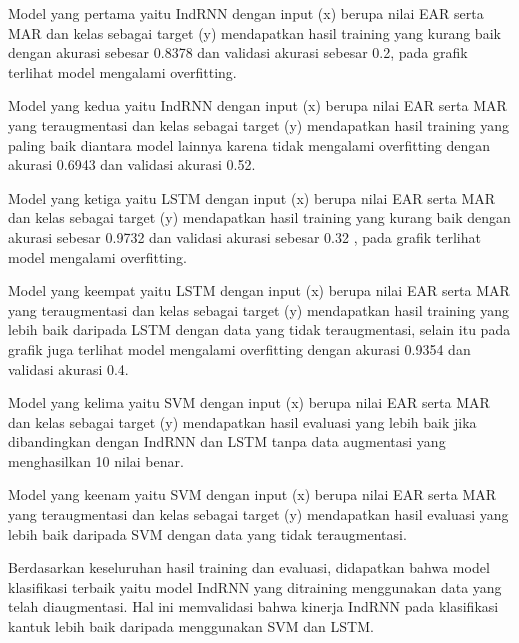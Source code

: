 Model yang pertama yaitu IndRNN dengan input (x) berupa nilai EAR serta MAR dan kelas
sebagai target (y) mendapatkan hasil training yang kurang baik dengan akurasi sebesar 0.8378 dan validasi akurasi sebesar 0.2,
pada grafik terlihat model mengalami overfitting.

Model yang kedua yaitu IndRNN dengan input (x) berupa nilai EAR serta MAR yang teraugmentasi dan kelas
sebagai target (y) mendapatkan hasil training yang paling baik diantara model lainnya karena tidak mengalami
overfitting dengan akurasi 0.6943 dan validasi akurasi 0.52.

Model yang ketiga yaitu LSTM dengan input (x) berupa nilai EAR serta MAR dan kelas
sebagai target (y) mendapatkan hasil training yang kurang baik dengan akurasi sebesar 0.9732 dan validasi akurasi sebesar 0.32
, pada grafik terlihat model mengalami overfitting.

Model yang keempat yaitu LSTM dengan input (x) berupa nilai EAR serta MAR yang teraugmentasi dan kelas
sebagai target (y) mendapatkan hasil training yang lebih baik daripada LSTM dengan data yang tidak teraugmentasi,
selain itu pada grafik juga terlihat model mengalami overfitting dengan akurasi 0.9354 dan validasi akurasi 0.4.

Model yang kelima yaitu SVM dengan input (x) berupa nilai EAR serta MAR dan kelas
sebagai target (y) mendapatkan hasil evaluasi yang lebih baik jika dibandingkan dengan IndRNN dan LSTM tanpa data
augmentasi yang menghasilkan 10 nilai benar.

Model yang keenam yaitu SVM dengan input (x) berupa nilai EAR serta MAR yang teraugmentasi dan kelas
sebagai target (y) mendapatkan hasil evaluasi yang lebih baik daripada SVM dengan data yang tidak teraugmentasi.

Berdasarkan keseluruhan hasil training dan evaluasi, didapatkan bahwa model klasifikasi terbaik yaitu model IndRNN yang
ditraining menggunakan data yang telah diaugmentasi. Hal ini memvalidasi bahwa kinerja IndRNN pada klasifikasi kantuk
lebih baik daripada menggunakan SVM dan LSTM.
